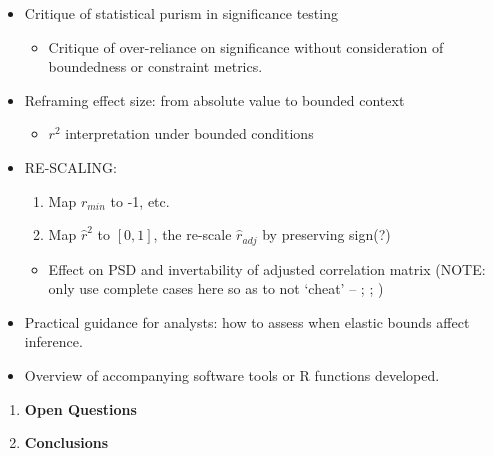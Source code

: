 \documentclass[
  12pt,
]{article}
\providecommand{\tightlist}{%
  \setlength{\itemsep}{0pt}\setlength{\parskip}{0pt}}
\theoremstyle{plain}
\theoremstyle{definition}
\theoremstyle{remark}
\begin{document}
\begin{itemize}
\tightlist
\item
  Critique of statistical purism in significance testing

  \begin{itemize}
  \tightlist
  \item
    Critique of over-reliance on significance without consideration of
    boundedness or constraint metrics.
  \end{itemize}
\item
  Reframing effect size: from absolute value to bounded context

  \begin{itemize}
  \tightlist
  \item
    \(r^2\) interpretation under bounded conditions
  \end{itemize}
\item
  RE-SCALING:

  \begin{enumerate}
  \def\labelenumi{\arabic{enumi}.}
  \tightlist
  \item
    Map \(r_{min}\) to -1, etc.
  \item
    Map \(\hat{r}^2\) to \([0,1]\), the re-scale \(\hat{r}_{adj}\) by
    preserving sign(?)
  \end{enumerate}

  \begin{itemize}
  \tightlist
  \item
    Effect on PSD and invertability of adjusted correlation matrix
    (NOTE: only use complete cases here so as to not `cheat' --
    \textcite{jaec09-positive}; \textcite{mish09-note};
    \textcite{shan23-impact})
  \end{itemize}
\item
  Practical guidance for analysts: how to assess when elastic bounds
  affect inference.
\item
  Overview of accompanying software tools or R functions developed.
\end{itemize}

\begin{enumerate}
\def\labelenumi{\arabic{enumi}.}
\setcounter{enumi}{6}
\item
  \textbf{Open Questions}
\item
  \textbf{Conclusions}
\end{enumerate}
\end{document}
